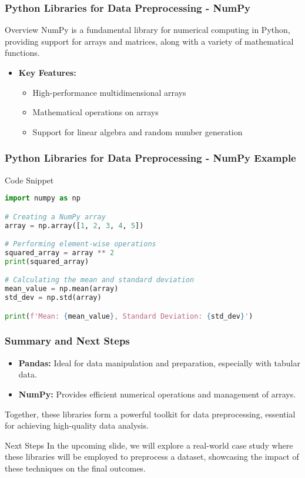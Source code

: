 \documentclass[aspectratio=169]{beamer}
\begin{document}
\begin{frame}
    \frametitle{Python Libraries for Data Preprocessing - NumPy}
    \begin{block}{Overview}
        NumPy is a fundamental library for numerical computing in Python, providing support for arrays and matrices, along with a variety of mathematical functions.
    \end{block}
    \begin{itemize}
        \item \textbf{Key Features:}
        \begin{itemize}
            \item High-performance multidimensional arrays
            \item Mathematical operations on arrays
            \item Support for linear algebra and random number generation
        \end{itemize}
    \end{itemize}
\end{frame}

\begin{frame}[fragile]
    \frametitle{Python Libraries for Data Preprocessing - NumPy Example}
    \begin{block}{Code Snippet}
        \begin{lstlisting}[language=Python]
import numpy as np

# Creating a NumPy array
array = np.array([1, 2, 3, 4, 5])

# Performing element-wise operations
squared_array = array ** 2
print(squared_array)

# Calculating the mean and standard deviation
mean_value = np.mean(array)
std_dev = np.std(array)

print(f'Mean: {mean_value}, Standard Deviation: {std_dev}')
        \end{lstlisting}
    \end{block}
\end{frame}

\begin{frame}
    \frametitle{Summary and Next Steps}
    \begin{itemize}
        \item \textbf{Pandas:} Ideal for data manipulation and preparation, especially with tabular data.
        \item \textbf{NumPy:} Provides efficient numerical operations and management of arrays.
    \end{itemize}
    Together, these libraries form a powerful toolkit for data preprocessing, essential for achieving high-quality data analysis.

    \begin{block}{Next Steps}
        In the upcoming slide, we will explore a real-world case study where these libraries will be employed to preprocess a dataset, showcasing the impact of these techniques on the final outcomes.
    \end{block}
\end{frame}
\end{document}
